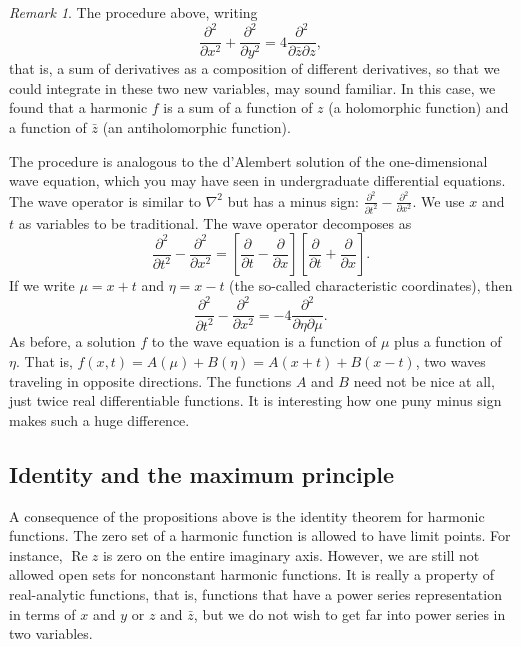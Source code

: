 \documentclass[12pt,openany]{book}
\renewcommand{\Re}{\operatorname{Re}}
\theoremstyle{plain}
\theoremstyle{remark}
\newtheorem{remark}[thm]{Remark}
\theoremstyle{definition}
\theoremstyle{exercise}
\theoremstyle{example}
\begin{document}
\begin{remark}
The procedure above, writing
\begin{equation*}
\frac{\partial^2}{\partial x^2}+ \frac{\partial^2}{\partial y^2} = 
4 \frac{\partial^2}{\partial \bar{z} \partial z} ,
\end{equation*}
that is, a sum of derivatives as a composition of
different derivatives,
so that we could integrate in these two new variables, may
sound familiar.  In this case, we found that a harmonic $f$ is a sum of a function
of $z$ (a holomorphic function) and a function of $\bar{z}$ (an
antiholomorphic function).

The procedure is analogous to the d'Alembert solution of the one-dimensional
wave equation, which you may have seen in undergraduate differential equations.
The wave operator is similar to $\nabla^2$ but has a minus sign:
$\frac{\partial^2}{\partial t^2}- \frac{\partial^2}{\partial x^2}$.
We use $x$ and $t$ as variables to be traditional.
The wave operator decomposes as
\begin{equation*}
\frac{\partial^2}{\partial t^2}- \frac{\partial^2}{\partial x^2}
=
\left[ \frac{\partial}{\partial t}- \frac{\partial}{\partial x}
\right]
\left[ \frac{\partial}{\partial t}+ \frac{\partial}{\partial x}
\right] .
\end{equation*}
If we write $\mu = x+t$ and $\eta = x-t$
(the so-called characteristic coordinates), then
\begin{equation*}
\frac{\partial^2}{\partial t^2}- \frac{\partial^2}{\partial x^2}
= 
-4 \frac{\partial^2}{\partial \eta \partial \mu} .
\end{equation*}
As before, a solution $f$ to the wave equation is a function
of $\mu$ plus a function of $\eta$.  That is, $f(x,t) = A(\mu) + B(\eta) =
A(x+t)+B(x-t)$, two waves traveling in opposite directions.  The
functions $A$ and $B$ need not be nice at all, just twice real differentiable
functions.
It is interesting how one puny minus sign makes such a huge difference.
\end{remark}

\subsection{Identity and the maximum principle}

A consequence of the propositions above is the identity theorem
for harmonic functions.
The zero set of a harmonic function is allowed to have limit points.
For instance, $\Re z$ is zero on the entire imaginary
axis.  However, we are still not allowed open sets for nonconstant harmonic
functions.  It is really a property of real-analytic functions, that is,
functions that have a power series representation in terms of $x$ and $y$
or $z$ and $\bar{z}$, but we do not wish to get far into power series in two
variables.
\end{document}
